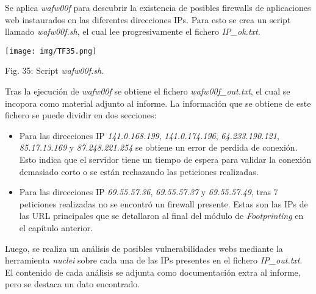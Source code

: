 \documentclass[12pt,oneside,a4paper]{book}
\begin{document}
\vspace{2em}

\hspace{20pt}
Se aplica \textit{wafw00f} para descubrir la existencia de posibles firewalls de aplicaciones web instaurados en las diferentes direcciones IPs. Para esto se crea un script llamado \textit{wafw00f.sh}, el cual lee progresivamente el fichero \textit{IP\_ok.txt}.

\vspace{2em}

\begin{center}
	\texttt{[image: img/TF35.png]}
    
\vspace{0.1em}
    
    Fig. 35: Script \textit{wafw00f.sh}.
\end{center}

\vspace{2em}

\hspace{20pt}
Tras la ejecución de \textit{wafw00f} se obtiene el fichero \textit{wafw00f\_out.txt}, el cual se incopora como material adjunto al informe. La información que se obtiene de este fichero se puede dividir en dos secciones:

\vspace{1em}

\begin{itemize}
	\item Para las direcciones IP \textit{141.0.168.199}, \textit{141.0.174.196}, \textit{64.233.190.121}, \textit{85.17.13.169} y \textit{87.248.221.254} se obtiene un error de perdida de conexión. Esto indica que el servidor tiene un tiempo de espera para validar la conexión demasiado corto o se están rechazando las peticiones realizadas.
	\item Para las direcciones IP  \textit{69.55.57.36}, \textit{69.55.57.37} y \textit{69.55.57.49}, tras 7 peticiones realizadas no se encontró un firewall presente. Estas son las IPs de las URL principales que se detallaron al final del módulo de \textit{Footprinting} en el capítulo anterior.
\end{itemize}

\vspace{1em}

\hspace{20pt}
Luego, se realiza un análisis de posibles vulnerabilidades webs mediante la herramienta \textit{nuclei} sobre cada una de las IPs presentes en el fichero \textit{IP\_out.txt}. El contenido de cada análisis se adjunta como documentación extra al informe, pero se destaca un dato encontrado.
\end{document}
